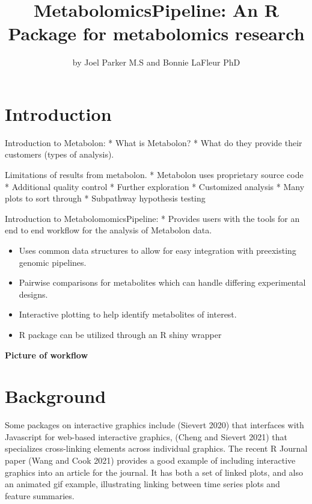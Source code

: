 \title{MetabolomicsPipeline: An R Package for metabolomics research}


\author{by Joel Parker M.S and Bonnie LaFleur PhD}

\maketitle


\section{Introduction}\label{introduction}

Introduction to Metabolon:
* What is Metabolon?
* What do they provide their customers (types of analysis).

Limitations of results from metabolon.
* Metabolon uses proprietary source code
* Additional quality control
* Further exploration
* Customized analysis
* Many plots to sort through
* Subpathway hypothesis testing

Introduction to MetabolomomicsPipeline:
* Provides users with the tools for an end to end workflow for the analysis
of Metabolon data.

\begin{itemize}
\item
  Uses common data structures to allow for easy integration with preexisting
  genomic pipelines.
\item
  Pairwise comparisons for metabolites which can handle differing experimental
  designs.
\item
  Interactive plotting to help identify metabolites of interest.
\item
  R package can be utilized through an R shiny wrapper
\end{itemize}

\textbf{Picture of workflow}

\section{Background}\label{background}

Some packages on interactive graphics include  (Sievert 2020) that interfaces with Javascript for web-based interactive graphics,  (Cheng and Sievert 2021) that specializes cross-linking elements across individual graphics. The recent R Journal paper  (Wang and Cook 2021) provides a good example of including interactive graphics into an article for the journal. It has both a set of linked plots, and also an animated gif example, illustrating linking between time series plots and feature summaries.

